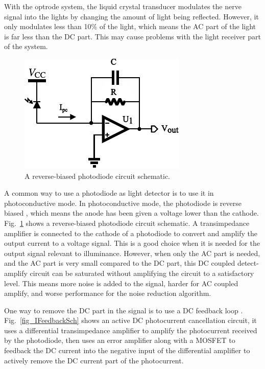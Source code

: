 With the optrode system, the liquid crystal transducer modulates the nerve signal into the lights by changing the amount of light being reflected.  However, it only modulates less than 10\% of the light, which means the AC part of the light is far less than the DC part.  This may cause problems with the light receiver part of the system.

\begin{figure}[h]
\centerline{\includegraphics[width=0.6\linewidth]{3-literature/ReverseBiasSch.pdf}}
\caption{A reverse-biased photodiode circuit schematic.}
\label{fig_ReverseBiasSch}
\end{figure}

A common way to use a photodiode as light detector is to use it in photoconductive mode.  In photoconductive mode, the photodiode is reverse biased \cite{PDbook}, which means the anode has been given a voltage lower than the cathode.  Fig.~\ref{fig_ReverseBiasSch} shows a reverse-biased photodiode circuit schematic.  A transimpedance amplifier is connected to the cathode of a photodiode to convert and amplify the output current to a voltage signal.  This is a good choice when it is needed for the output signal relevant to illuminance.  However, when only the AC part is needed, and the AC part is very small compared to the DC part, this DC coupled detect-amplify circuit can be saturated without amplifying the circuit to a satisfactory level.  This means more noise is added to the signal, harder for AC coupled amplify, and worse performance for the noise reduction algorithm.

One way to remove the DC part in the signal is to use a DC feedback loop \cite{IOffsetTIA}.  Fig.~\ref{fig_IFeedbackSch} shows an active DC photocurrent cancellation circuit, it uses a differential transimpedance amplifier to amplify the photocurrent received by the photodiode, then uses an error amplifier along with a MOSFET to feedback the DC current into the negative input of the differential amplifier to actively remove the DC current part of the photocurrent.


